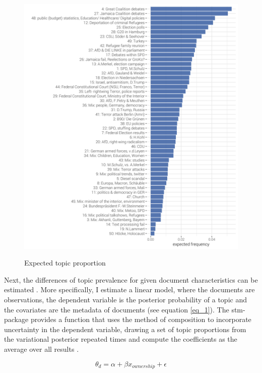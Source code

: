 \documentclass[12pt,a4paper,notitlepage]{article}
\begin{document}
\begin{figure}[H]
	\begin{center}
	\caption{Expected topic proportion}
		\includegraphics[width=\textwidth,keepaspectratio]{../figs/topic_proportion.png}
		\label{fig_topic_proportion}
\end{center}
\end{figure}

Next, the differences of topic prevalence for given document characteristics can be estimated \citep{roberts_model_2016}. More specifically, I estimate a linear model, where the documents are observations, the dependent variable is the posterior probability of a topic and the covariates are the metadata of documents (see equation \ref{eq_1}). The stm-package provides a function that uses the method of composition to incorporate uncertainty in the dependent variable, drawing a set of topic proportions from the variational posterior repeated times and compute the coefficients as the average over all results \citep{roberts_stm:_2016}.

\begin{equation}\label{eq_1}
	\theta_d=\alpha+\beta x_{ownership}+\epsilon
\end{equation}
\end{document}
